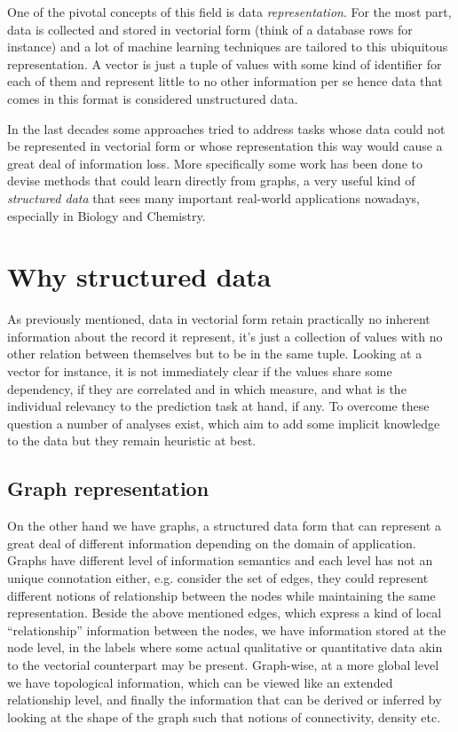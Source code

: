 One of the pivotal concepts of this field is data \emph{representation}.
For the most part, data is collected and stored in vectorial form (think of
a database rows for instance) and a lot of machine learning techniques are
tailored to this ubiquitous representation.
A vector is just a tuple of values with some kind of identifier for each of them
and represent little to no other information per se hence data that comes in
this format is considered unstructured data.

In the last decades some approaches tried to address tasks whose data could
not be represented in vectorial form or whose representation this way would cause
a great deal of information loss.
More specifically some work has been done to devise methods that could learn
directly from graphs, a very useful kind of \emph{structured data} that sees many
important real-world applications nowadays, especially in Biology and Chemistry.


\section{Why structured data}
As previously mentioned, data in vectorial form retain practically no inherent
information about the record it represent, it's just a collection of values with
no other relation between themselves but to be in the same tuple.
Looking at a vector for instance, it is not immediately clear if the values share
some dependency, if they are correlated and in which measure, and what is the
individual relevancy to the prediction task at hand, if any.
To overcome these question a number of analyses exist, which aim to add some
implicit knowledge to the data but they remain heuristic at best.

\subsection{Graph representation}
On the other hand we have graphs, a structured data form that can represent
a great deal of different information depending on the domain of application.
Graphs have different level of information semantics and each level has not an
unique connotation either, e.g. consider the set of edges, they could represent
different notions of relationship between the nodes while maintaining the same
representation.
Beside the above mentioned edges, which express a kind of local ``relationship''
information between the nodes, we have information stored at the node level, in the
labels where some actual qualitative or quantitative data akin to the vectorial
counterpart may be present.
Graph-wise, at a more global level we have topological information, which can be
viewed like an extended relationship level, and finally the information that can
be derived or inferred by looking at the shape of the graph such that notions
of connectivity, density etc.

